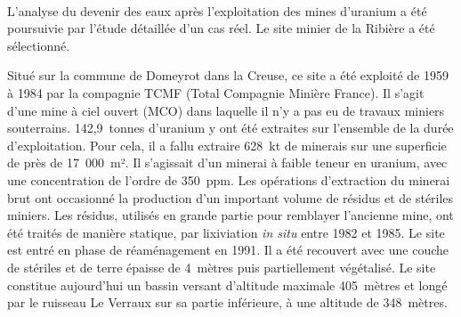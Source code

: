 \documentclass{article}
\newcommand{\blue}[1]{\textcolor{blue}{#1}} %
\begin{document}
\paragraph{} L'analyse du devenir des eaux après l'exploitation des mines d'uranium a été poursuivie par l'étude détaillée d'un cas réel. Le site minier de la Ribière a été sélectionné. 


Situé sur la commune de Domeyrot dans la Creuse, ce site a été exploité de 1959 à 1984 par la compagnie TCMF (Total Compagnie Minière France). Il s'agit d'une mine à ciel ouvert (MCO) dans laquelle il n'y a pas eu de travaux miniers souterrains. 142,9~tonnes d’uranium y ont été extraites sur l’ensemble de la durée d’exploitation. Pour cela, il a fallu extraire 628~kt de minerais sur une superficie de près de 17~000~m². Il s'agissait d’un minerai à faible teneur en uranium, avec une concentration de l’ordre de 350~ppm. Les opérations d'extraction du minerai brut ont occasionné la production d'un important volume de résidus et de stériles miniers. Les résidus, utilisés en grande partie pour remblayer l’ancienne mine, ont été traités de manière statique, par lixiviation \textit{in situ} entre 1982 et 1985. Le site est entré en phase de réaménagement en 1991. Il a été recouvert avec une couche de stériles et de terre épaisse de 4~mètres puis partiellement végétalisé. Le site constitue aujourd'hui un bassin versant d’altitude maximale 405~mètres et longé par le ruisseau Le Verraux sur sa partie inférieure, à une altitude de 348~mètres.
\end{document}
